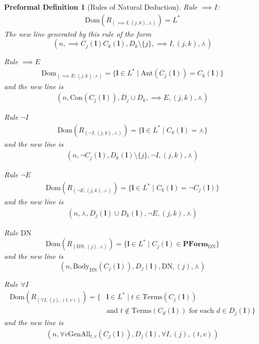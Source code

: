 \documentclass[oneside, 12pt]{book}
\theoremstyle{break}
\newtheorem{preformal definition}[definition]{Preformal Definition}
\newtheorem{preformal theorem}[theorem]{Preformal Theorem}
\newcommand{\bv}[1]{\boldsymbol{#1}}
\begin{document}
\begin{preformal definition}[Rules of Natural Deduction]
			Rule $\implies I$:
			\begin{align*}
				\text{Dom}(R_{(\implies I, (j, k), \curlywedge)}) = L^*
			\end{align*}
			The new line generated by this rule of the form
			\begin{equation*}
				(n, \implies C_j(\bv{l}) C_k(\bv{l}), D_k \setminus \{j\}, \implies I, (j, k), \curlywedge)
			\end{equation*}
			
			Rule $\implies E$
			\begin{align*}
				\text{Dom}_{(\implies E, (j, k), \curlywedge)} = \{\bv{l} \in L^* \mid \text{Ant}(C_j(\bv{l})) = C_k(\bv{l})\}
			\end{align*}
			and the new line is
			\begin{align*}
				(n, \text{Con}(C_j(\bv{l})), D_j \cup D_k, \implies E, (j, k), \curlywedge)
			\end{align*}
			
			Rule $\lnot I$
			\begin{align*}
				\text{Dom}(R_{(\lnot I, (j, k), \curlywedge)}) = \{\bv{l} \in L^* \mid C_k(\bv{l}) = \curlywedge\}
			\end{align*}
			and the new line is
			\begin{align*}
				(n, \lnot C_j(\bv{l}), D_k(\bv{l}) \setminus \{j\}, \lnot I, (j, k), \curlywedge)
			\end{align*}
			
			Rule $\lnot E$
			\begin{align*}
				\text{Dom}(R_{(\lnot E, (j, k), \curlywedge)}) = \{\bv{l}\in L^* \mid C_k(\bv{l}) = \lnot C_j(\bv{l})\}
			\end{align*}
			and the new line is
			\begin{align*}
				(n, \curlywedge, D_j(\bv{l}) \cup D_k(\bv{l}), \lnot E,  (j, k), \curlywedge)
			\end{align*}
			
			Rule $\text{DN}$
			\begin{equation*}
				\text{Dom}(R_{(\text{DN}, (j), \curlywedge)}) = \{\bv{l} \in L^* \mid C_j(\bv{l}) \in \textbf{PForm}_{\text{DN}}\}
			\end{equation*}
			and the new line is
			\begin{equation*}
				(n, \text{Body}_{\text{DN}}(C_j(\bv{l})), D_j(\bv{l}), \text{DN}, (j), \curlywedge)
			\end{equation*}
			
			Rule $\forall I$
			\begin{align*}
				\text{Dom}(R_{(\forall I, (j), (t, v))}) = \{&\bv{l}\in L^* \mid t\in \text{Terms}(C_j(\bv{l}))\\ 
				&\text{and } t\not \in \text{Terms}(C_d(\bv{l})) \text{ for each } d \in D_j(\bv{l})\}
			\end{align*}
			and the new line is
			\begin{align*}
				(n, \forall v \text{GenAll}_{t, v}(C_j(\bv{l})), D_j(\bv{l}), \forall I, (j), (t, v))
			\end{align*}
			

\end{preformal definition}
\end{document}
